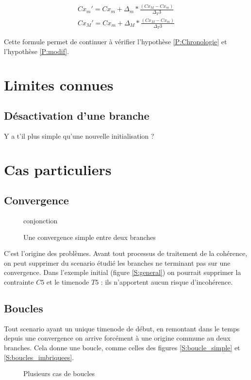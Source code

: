 \documentclass[10pt,a4paper]{article}
\newcommand{\hyporef}[1]{l'hypothèse \ref{#1}}
\begin{document}
\begin{eqnarray}
	Cx_{m}' = Cx_m + \Delta_m *\frac{(Cx_M - Cx_m)}{\Delta_T3}\\
	Cx_{M}' = Cx_m + \Delta_M *\frac{(Cx_M - Cx_m)}{\Delta_T3} \nonumber
\end{eqnarray}

Cette formule permet de continuer à vérifier \hyporef{P:Chronologie} et \hyporef{P:modif}.

\section{Limites connues}
	
	\subsection{Désactivation d'une branche}
Y a t'il plus simple qu'une nouvelle initialisation ?

\section{Cas particuliers}

	\subsection{Convergence}
	\begin{figure}[htp]
		\centering
		
		\schemaScenario conjonction
		\caption{Une convergence simple entre deux branches}
		\label{S:conjonction}
	\end{figure}
C'est l'origine des problèmes. Avant tout processus de traitement de la cohérence, on peut supprimer du scenario étudié les branches ne terminant pas sur une convergence. Dans l'exemple initial (figure \ref{S:general}) on pourrait supprimer la contrainte $C5$ et le timenode $T5$ : ils n'apportent aucun risque d'incohérence.

	\subsection{Boucles}
Tout scenario ayant un unique timenode de début, en remontant dans le temps depuis une convergence on arrive forcément à une origine commune au deux branches. Cela donne une boucle, comme celles des figures \ref{S:boucle_simple} et \ref{S:boucles_imbriquees}.
	
	\begin{figure}[htp]
		\begin{center}
					\hspace{5pt}
			
				\caption{Plusieurs cas de boucles}
		\end{center}
	\end{figure}
	
\end{document}
